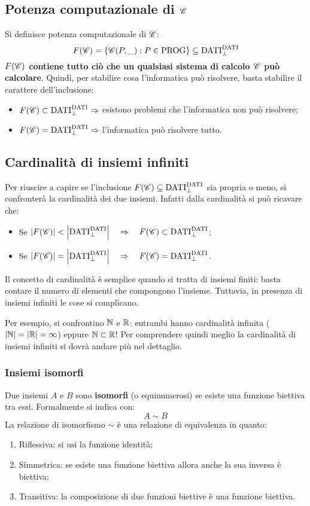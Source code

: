 \subsection{Potenza computazionale di \texorpdfstring{$\mathscr{C}$}{C}
\label{sec:pot_comp}}
Si definisce potenza computazionale di $\mathscr{C}$:
$$ F(\mathscr{C}) = \{\mathscr{C}(P,\_):P\in\text{PROG}\} \subseteq \text{DATI}^{\text{DATI}}_\perp $$
\textbf{$F(\mathscr{C})$ contiene tutto ciò che un qualsiasi sistema di calcolo $\mathscr{C}$
può calcolare}. Quindi, per stabilire cosa l'informatica può risolvere, basta stabilire
il carattere dell'inclusione:
\begin{itemize}
    \item $F(\mathscr{C})\subset\text{DATI}^{\text{DATI}}_\perp \Rightarrow $
        esistono problemi che l'informatica non può risolvere;
    \item $F(\mathscr{C})=\text{DATI}^{\text{DATI}}_\perp \Rightarrow $
        l'informatica può risolvere tutto.
\end{itemize}

\subsection{Cardinalità di insiemi infiniti}
Per riuscire a capire se l'inclusione
$F(\mathscr{C})\subseteq\text{DATI}^{\text{DATI}}_\perp$ sia propria o meno, si confronterà
la cardinalità dei due insiemi. Infatti dalla cardinalità si può ricavare che:
\begin{itemize}
    \item Se $|F(\mathscr{C})|<\left|\text{DATI}^{\text{DATI}}_\perp\right|
    \quad \Rightarrow \quad F(\mathscr{C})\subset\text{DATI}^{\text{DATI}}_\perp$;
    \item Se $|F(\mathscr{C})|=\left|\text{DATI}^{\text{DATI}}_\perp\right|
    \quad \Rightarrow \quad F(\mathscr{C})=\text{DATI}^{\text{DATI}}_\perp$.
\end{itemize}

Il concetto di cardinalità è semplice quando si tratta di insiemi finiti: basta
contare il numero di elementi che compongono l'insieme. Tuttavia, in presenza
di insiemi infiniti le cose si complicano.

Per esempio, si confrontino $\mathbb{N}$ e $\mathbb{R}$: entrambi hanno cardinalità infinita
($|\mathbb{N}|=|\mathbb{R}|=\infty$) eppure $\mathbb{N}\subset\mathbb{R}$! Per comprendere quindi meglio
la cardinalità di insiemi infiniti si dovrà andare più nel dettaglio.

\subsubsection{Insiemi isomorfi}
Due insiemi $A$ e $B$ sono \textbf{isomorfi} (o equinumerosi) se esiste una funzione
biettiva tra essi. Formalmente si indica con:
$$ A\sim B $$
La relazione di isomorfismo $\sim$ è una relazione di equivalenza in quanto:
\begin{enumerate}
    \item Riflessiva: si usi la funzione identità;
    \item Simmetrica: se esiste una funzione biettiva allora anche la sua inversa
        è biettiva;
    \item Transitiva: la composizione di due funzioni biettive è una funzione biettiva.
\end{enumerate}

